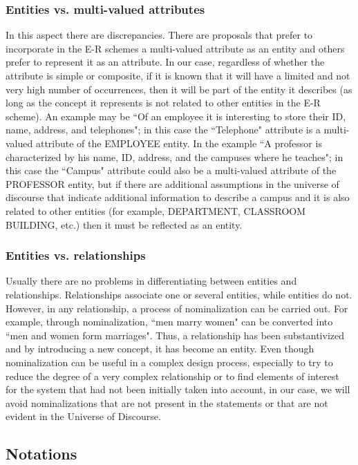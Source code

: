 \documentclass{article}
\begin{document}
\subsubsection{Entities vs. multi-valued attributes}

In this aspect there are discrepancies.  There are proposals that prefer to incorporate in the E-R schemes a multi-valued attribute as an entity and others prefer to represent it as an attribute.  In our case, regardless of whether the attribute is simple or composite, if it is known that it will have a limited and not very high number of occurrences, then it will be part of the entity it describes (as long as the concept it represents is not related to other entities in the E-R scheme).  An example may be ``Of an employee it is interesting to store their ID, name, address, and telephones"; in this case the ``Telephone" attribute is a multi-valued attribute of the EMPLOYEE entity.  In the example ``A professor is characterized by his name, ID, address, and the campuses where he teaches"; in this case the ``Campus" attribute could also be a multi-valued attribute of the PROFESSOR entity, but if there are additional assumptions in the universe of discourse that indicate additional information to describe a campus and it is also related to other entities (for example, DEPARTMENT, CLASSROOM BUILDING, etc.) then it must be reflected as an entity.

\subsubsection{Entities vs. relationships}

Usually there are no problems in differentiating between entities and relationships.  Relationships associate one or several entities, while entities do not.  However, in any relationship, a process of nominalization can be carried out.  For example, through nominalization, ``men marry women" can be converted into ``men and women form marriages".  Thus, a relationship has been substantivized and by introducing a new concept, it has become an entity.  Even though nominalization can be useful in a complex design process, especially to try to reduce the degree of a very complex relationship or to find elements of interest for the system that had not been initially taken into account, in our case, we will avoid nominalizations that are not present in the statements or that are not evident in the Universe of Discourse.

\subsection{Notations}
\end{document}
